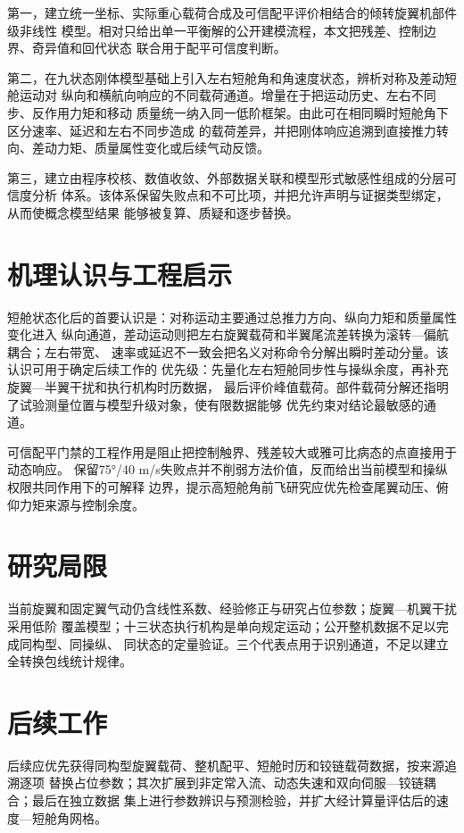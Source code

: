 \documentclass[UTF8,12pt,oneside,openany,fontset=windows]{ctexbook}
\begin{document}
第一，建立统一坐标、实际重心载荷合成及可信配平评价相结合的倾转旋翼机部件级非线性 模型。相对只给出单一平衡解的公开建模流程，本文把残差、控制边界、奇异值和回代状态 联合用于配平可信度判断。

第二，在九状态刚体模型基础上引入左右短舱角和角速度状态，辨析对称及差动短舱运动对 纵向和横航向响应的不同载荷通道。增量在于把运动历史、左右不同步、反作用力矩和移动 质量统一纳入同一低阶框架。由此可在相同瞬时短舱角下区分速率、延迟和左右不同步造成 的载荷差异，并把刚体响应追溯到直接推力转向、差动力矩、质量属性变化或后续气动反馈。

第三，建立由程序校核、数值收敛、外部数据关联和模型形式敏感性组成的分层可信度分析 体系。该体系保留失败点和不可比项，并把允许声明与证据类型绑定，从而使概念模型结果 能够被复算、质疑和逐步替换。

\section{机理认识与工程启示}

短舱状态化后的首要认识是：对称运动主要通过总推力方向、纵向力矩和质量属性变化进入 纵向通道，差动运动则把左右旋翼载荷和半翼尾流差转换为滚转—偏航耦合；左右带宽、 速率或延迟不一致会把名义对称命令分解出瞬时差动分量。该认识可用于确定后续工作的 优先级：先量化左右短舱同步性与操纵余度，再补充旋翼—半翼干扰和执行机构时历数据， 最后评价峰值载荷。部件载荷分解还指明了试验测量位置与模型升级对象，使有限数据能够 优先约束对结论最敏感的通道。

可信配平门禁的工程作用是阻止把控制触界、残差较大或雅可比病态的点直接用于动态响应。 保留75°/40 m/s失败点并不削弱方法价值，反而给出当前模型和操纵权限共同作用下的可解释 边界，提示高短舱角前飞研究应优先检查尾翼动压、俯仰力矩来源与控制余度。

\section{研究局限}

当前旋翼和固定翼气动仍含线性系数、经验修正与研究占位参数；旋翼—机翼干扰采用低阶 覆盖模型；十三状态执行机构是单向规定运动；公开整机数据不足以完成同构型、同操纵、 同状态的定量验证。三个代表点用于识别通道，不足以建立全转换包线统计规律。

\section{后续工作}

后续应优先获得同构型旋翼载荷、整机配平、短舱时历和铰链载荷数据，按来源追溯逐项 替换占位参数；其次扩展到非定常入流、动态失速和双向伺服—铰链耦合；最后在独立数据 集上进行参数辨识与预测检验，并扩大经计算量评估后的速度—短舱角网格。
\end{document}
